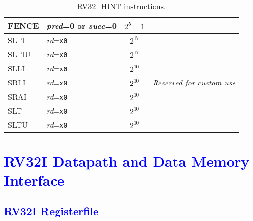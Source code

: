 \begin{table}[hbt]
\begin{tabular}{|l|l|c|l|}
  FENCE                 & {\em pred}=0 or {\em succ}=0                & $2^{5}-1$                   & \\ \hline \hline
  SLTI                  & {\em rd}={\tt x0}                           & $2^{17}$                    & \multirow{7}{*}{\em Reserved for custom use} \\ \cline{1-3}
  SLTIU                 & {\em rd}={\tt x0}                           & $2^{17}$                    & \\ \cline{1-3}
  SLLI                  & {\em rd}={\tt x0}                           & $2^{10}$                    & \\ \cline{1-3}
  SRLI                  & {\em rd}={\tt x0}                           & $2^{10}$                    & \\ \cline{1-3}
  SRAI                  & {\em rd}={\tt x0}                           & $2^{10}$                    & \\ \cline{1-3}
  SLT                   & {\em rd}={\tt x0}                           & $2^{10}$                    & \\ \cline{1-3}
  SLTU                  & {\em rd}={\tt x0}                           & $2^{10}$                    & \\ \hline
\end{tabular}
\caption{RV32I HINT instructions.}
\label{tab:rv32i-hints}
\end{table}

\newpage

\section{\textcolor{blue}{RV32I Datapath and Data Memory Interface}}

\subsection{\textcolor{blue}{RV32I Registerfile}}

